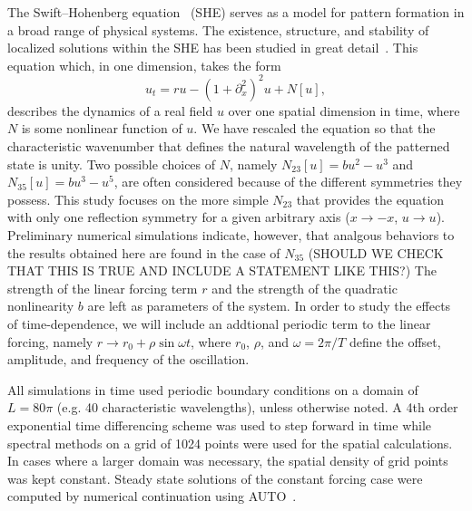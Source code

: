 \documentclass[../main/TimeForcingSHE.tex]{subfiles}
\begin{document}
The Swift--Hohenberg equation~\cite{swift1977} (SHE) serves as a model for pattern formation in a broad range of physical systems.  The existence, structure, and stability of localized solutions within the SHE has been studied in great detail~\cite{burke2006,burke2007snakes,burke2007stability}.   This equation which, in one dimension, takes the form  
\begin{equation}
u_t= r u-\left(1+\partial_{x}^2\right)^2u+N[u]\label{eq:SH},
\end{equation}
describes the dynamics of a real field $u$ over one spatial dimension in time, where $N$ is some nonlinear function of $u$.  We have rescaled the equation so that the characteristic wavenumber that defines the natural wavelength of the patterned state is unity.  Two possible choices of $N$, namely $N_{23}[u]=bu^2-u^3$ and $N_{35}[u]=b u^3-u^5$, are often considered because of the different symmetries they possess.  This study focuses on the more simple  $N_{23}$ that provides the equation with only one reflection symmetry for a given arbitrary axis ($x\rightarrow -x$, $u\rightarrow u$).  Preliminary numerical simulations indicate, however, that analgous behaviors to the results obtained here are found in the case of $N_{35}$ (SHOULD WE CHECK THAT THIS IS TRUE AND INCLUDE A STATEMENT LIKE THIS?)     The strength of the linear forcing term $r$ and the strength of the quadratic nonlinearity $b$ are left as parameters of the system.  In order to study the effects of time-dependence, we will include an addtional periodic term to the linear forcing, namely $r\rightarrow r_0+\rho \sin\omega t$, where $r_0$, $\rho$, and $\omega=2\pi/T$ define the offset, amplitude, and frequency of the oscillation. 



All simulations in time used periodic boundary conditions on a domain of $L=80\pi$ (e.g. 40 characteristic wavelengths), unless otherwise noted.  A 4th order exponential time differencing scheme\cite{cox2002} was used to step forward  in time while spectral methods on a grid of 1024 points were used for the spatial calculations.  In cases where a larger domain was necessary, the spatial density of grid points was kept constant.    Steady state solutions of the constant forcing case were computed by numerical continuation using AUTO~\cite{doedel1981auto}.  
\end{document}
